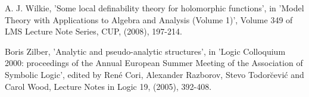 \documentclass[12pt,nodate]{article}
\begin{document}
 
 \noindent
 [W3] A. J. Wilkie, 'Some local definability theory for holomorphic functions', in 'Model Theory with Applications to Algebra and Analysis (Volume 1)', Volume 349 of LMS Lecture Note Series, CUP, (2008), 197-214. 

\vspace{1mm}

\noindent
[Z] Boris Zilber, 'Analytic and pseudo-analytic structures',  in 'Logic Colloquium 2000: proceedings of the Annual European Summer Meeting of the Association of Symbolic Logic', edited by Ren\'{e} Cori, Alexander Razborov, Stevo Todor\u{c}evi\'{c} and Carol Wood, Lecture Notes in Logic 19, (2005), 392-408.

 
 
 
 
\end{document}
